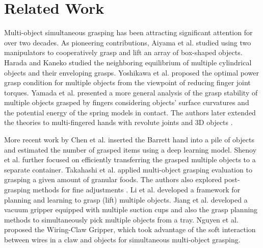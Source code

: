 \section{Related Work}

Multi-object simultaneous grasping has been attracting significant attention for over two decades. As pioneering contributions, Aiyama et al. \cite{aiyama98} studied using two manipulators to cooperatively grasp and lift an array of box-shaped objects. Harada and Kaneko \cite{harada00neighbouring}\cite{harada98enveloping} studied the neighboring equilibrium of multiple cylindrical objects and their enveloping grasps. Yoshikawa et al. \cite{yoshikawa2001optimization} proposed the optimal power grasp condition for multiple objects from the viewpoint of reducing finger joint torques. Yamada et al. \cite{yamada2009grasp} presented a more general analysis of the grasp stability of multiple objects grasped by fingers considering objects' surface curvatures and the potential energy of the spring models in contact. The authors later extended the theories to multi-fingered hands with revolute joints \cite{yamada2012stability} and 3D objects \cite{yamada2015static}. 

More recent work by Chen et al. \cite{chen2021multiobjectgrasping} inserted the Barrett hand into a pile of objects and estimated the number of grasped items using a deep learning model. Shenoy et al. \cite{shenoy2022multi} further focused on efficiently transferring the grasped multiple objects to a separate container. Takahashi et al. \cite{takahashi2021uncertainty} applied multi-object grasping evaluation to grasping a given amount of granular foods. The authors also explored post-grasping methods for fine adjustments \cite{takahashi2021target}. Li et al. \cite{li2024graspmultiple} developed a framework for planning and learning to grasp (lift) multiple objects. Jiang et al. \cite{jiang24multiobject} developed a vacuum gripper equipped with multiple suction cups and also the grasp planning methods to simultaneously pick multiple objects from a tray. Nguyen et al. \cite{nguyen2023wiringclaw} proposed the Wiring-Claw Gripper, which took advantage of the soft interaction between wires in a claw and objects for simultaneous multi-object grasping.

